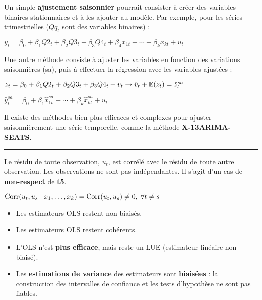 \begin{f}[Saisonnalité]
Un simple \textbf{ajustement saisonnier} pourrait consister à créer des variables binaires stationnaires et à les ajouter au modèle. Par exemple, pour les séries trimestrielles (\(Q q_{t}\) sont des variables binaires) :

\begin{center}
	\(y_{t} = \beta_{0} + \beta_{1} Q2_{t} + \beta_{2} Q3_{t} + \beta_{3} Q4_{t} + \beta_{4} x_{1t} + \cdots + \beta_{k} x_{kt} + u_{t}\)
\end{center}

Une autre méthode consiste à ajuster les variables en fonction des variations saisonnières (sa), puis à effectuer la régression avec les variables ajustées :

\begin{center}
	\(z_{t} = \beta_{0} + \beta_{1} Q2_{t} + \beta_{2} Q3_{t} + \beta_{3} Q4_{t} + v_{t} \rightarrow \hat{v}_{t} + \mathbb{E}(z_{t}) = \hat{z}_{t}^{sa}\)
	
	\(\hat{y}_{t}^{sa}= \beta_{0} + \beta_{1} \hat{x}_{1t}^{sa} + \cdots + \beta_{k} \hat{x}_{kt}^{sa} + u_{t}\)
\end{center}

Il existe des méthodes bien plus efficaces et complexes pour ajuster saisonnièrement une série temporelle, comme la méthode \textbf{X-13ARIMA-SEATS}.

\end{f}  \hrule

\begin{f}[Autocorrélation]

Le résidu de toute observation, \(u_{t}\), est corrélé avec le résidu de toute autre observation. Les observations ne sont pas indépendantes. Il s'agit d'un cas de \textbf{non-respect} de \textbf{t5}.

\begin{center}
	\(\mathrm{Corr}(u_{t}, u_{s} \mid x_{1}, \ldots, x_{k}) = \mathrm{Corr}(u_{t}, u_{s}) \neq 0, \; \forall t \neq s\)
\end{center}

\end{f}    
\begin{f}[Conséquences]

\begin{itemize}[leftmargin=*]
	\item Les estimateurs OLS restent non biaisés.
	\item Les estimateurs OLS restent cohérents.
	\item L'OLS n'est \textbf{plus efficace}, mais reste un LUE (estimateur linéaire non biaisé).
	\item Les \textbf{estimations de variance} des estimateurs sont \textbf{biaisées} : la construction des intervalles de confiance et les tests d'hypothèse ne sont pas fiables.
\end{itemize}

\end{f}    

